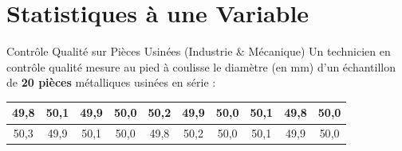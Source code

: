 \chapter{Statistiques à une Variable}

\begin{activite}{Contrôle Qualité sur Pièces Usinées (Industrie \& Mécanique)}
Un technicien en contrôle qualité mesure au pied à coulisse le diamètre (en $\text{mm}$) d'un échantillon de \textbf{20 pièces} métalliques usinées en série :
\begin{center}
\renewcommand{\arraystretch}{1.2}
\begin{tabular}{|c|c|c|c|c|c|c|c|c|c|}
\hline
49{,}8 & 50{,}1 & 49{,}9 & 50{,}0 & 50{,}2 & 49{,}9 & 50{,}0 & 50{,}1 & 49{,}8 & 50{,}0 \\
\hline
50{,}3 & 49{,}9 & 50{,}1 & 50{,}0 & 49{,}8 & 50{,}2 & 50{,}0 & 50{,}1 & 49{,}9 & 50{,}0 \\
\hline
\end{tabular}
\end{center}


\end{activite}
